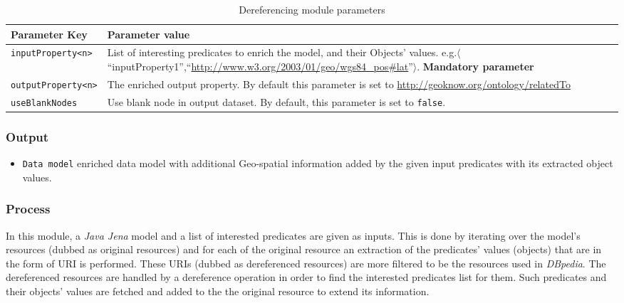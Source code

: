 \documentclass[a4paper,twoside,bibtotoc,abstracton,12pt,BCOR=15mm]{article}
\begin{document}
\begin{table}
\caption{Dereferencing module parameters} \label{tbl:derefPram}
\small
\begin{tabularx}{\textwidth}{@{}lX@{}}
\toprule
\textbf{Parameter Key} 		& \textbf{Parameter value}\\
\toprule
\texttt{inputProperty<n>} 	& List of interesting predicates to enrich the model, and their Objects' values. e.g.$\langle$``inputProperty1'',``\url{http://www.w3.org/2003/01/geo/wgs84_pos#lat}''$\rangle$. \textbf{Mandatory parameter}\\
\midrule
\texttt{outputProperty<n>} 	& The enriched output property. By default this parameter is set to \url{http://geoknow.org/ontology/relatedTo}\\
\midrule
\texttt{useBlankNodes}		& Use blank node in output dataset. By default, this parameter is set to \texttt{false}.\\
\bottomrule
\end{tabularx}
\end{table}


\subsubsection{Output}
\begin{itemize}
 \item \texttt{Data model} enriched data model with additional Geo-spatial information added by the given input predicates with its extracted object values.
\end{itemize}

\subsubsection{Process}
 In this module, a \emph{Java Jena} model and a list of interested predicates are given as inputs.
 This is done by iterating over the model's resources (dubbed as original resources) 
 and for each of the original resource an extraction of the predicates' values (objects) that are in the form of URI is performed. 
 These URIs (dubbed as dereferenced resources) are more filtered to be the resources used in \emph{DBpedia}.
 The dereferenced resources are handled by a dereference operation in order to find the interested predicates list for them.
 Such predicates and their objects' values are fetched and added to the the original resource to extend its information.
\end{document}

